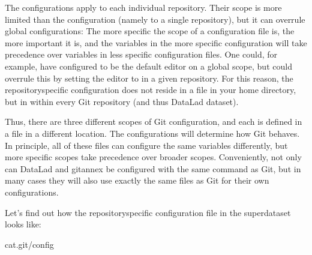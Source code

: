 \sphinxAtStartPar
The  configurations apply to each individual
repository. Their scope is more limited than the 
configuration (namely to a single repository), but it can overrule global
configurations: The more specific the scope of a configuration file is, the more
important it is, and the variables in the more specific configuration
will take precedence over variables in less specific configuration files.
One could, for example, have {\hyperref[\detokenize{glossary:term-vim}]{}} configured to be the default editor
on a global scope, but could overrule this by setting the editor to 
in a given repository. For this reason, the repository\sphinxhyphen{}specific configuration
does not reside in a file in your home directory, but in 
within every Git repository (and thus DataLad dataset).

\sphinxAtStartPar
Thus, there are three different scopes of Git configuration, and each is defined
in a  file in a different location. The configurations will determine
how Git behaves. In principle, all of these files can configure
the same variables differently, but more specific scopes take precedence over broader
scopes. Conveniently, not only can DataLad and git\sphinxhyphen{}annex be configured with
the same command as Git, but in many cases they will also use exactly the same
files as Git for their own configurations.

\ignorespaces 
\sphinxAtStartPar
Let’s find out how the repository\sphinxhyphen{}specific configuration file in the 
superdataset looks like:

\begin{sphinxVerbatim}[commandchars=\\\{\}]
cat.git/config
\end{sphinxVerbatim}

